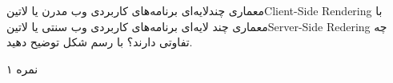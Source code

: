 
معماری چند‌لایه‌ای برنامه‌های کاربردی وب مدرن یا ‌لاتین{Client-Side Rendering}
با معماری چند لایه‌ای برنامه‌های کاربردی وب سنتی یا ‌لاتین{Server-Side Redering}
چه تفاوتی دارند؟ با رسم شکل توضیح دهید.

۱ نمره
